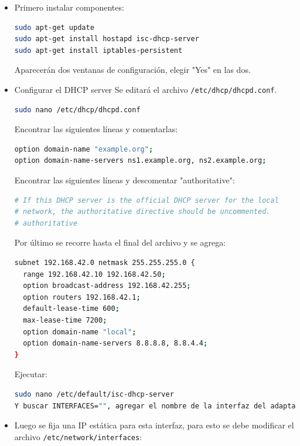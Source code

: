 \begin{itemize}

\item Primero instalar componentes:

\begin{lstlisting}[language=bash]
sudo apt-get update
sudo apt-get install hostapd isc-dhcp-server
sudo apt-get install iptables-persistent
\end{lstlisting}

Aparecerán dos ventanas de configuración, elegir "Yes" en las dos.
\item Configurar el DHCP server
Se editará el archivo \lstinline[columns=fixed]{/etc/dhcp/dhcpd.conf}.

\begin{lstlisting}[language=bash]
sudo nano /etc/dhcp/dhcpd.conf
\end{lstlisting}

Encontrar las siguientes líneas y comentarlas:

\begin{lstlisting}[language=bash]
option domain-name "example.org";
option domain-name-servers ns1.example.org, ns2.example.org;
\end{lstlisting}

Encontrar las siguientes líneas y descomentar "authoritative":

\begin{lstlisting}[language=bash]
# If this DHCP server is the official DHCP server for the local
# network, the authoritative directive should be uncommented.
# authoritative
\end{lstlisting}

Por último se recorre hasta el final del archivo y se agrega:

\begin{lstlisting}[language=bash]
subnet 192.168.42.0 netmask 255.255.255.0 { 
  range 192.168.42.10 192.168.42.50;
  option broadcast-address 192.168.42.255;
  option routers 192.168.42.1;
  default-lease-time 600;
  max-lease-time 7200;
  option domain-name "local";
  option domain-name-servers 8.8.8.8, 8.8.4.4;
}
\end{lstlisting}

Ejecutar:
\begin{lstlisting}[language=bash]
sudo nano /etc/default/isc-dhcp-server
Y buscar INTERFACES="", agregar el nombre de la interfaz del adaptador de WiFi.
\end{lstlisting}

\item Luego se fija una IP estática para esta interfaz, para esto se debe modificar el archivo \lstinline[columns=fixed]{/etc/network/interfaces}:


\end{itemize}
